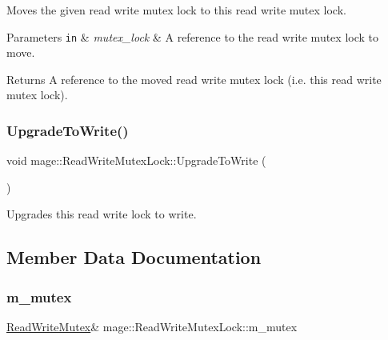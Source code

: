 Moves the given read write mutex lock to this read write mutex lock.


\begin{DoxyParams}[1]{Parameters}
\mbox{\tt in}  & {\em mutex\+\_\+lock} & A reference to the read write mutex lock to move. \\
\hline
\end{DoxyParams}
\begin{DoxyReturn}{Returns}
A reference to the moved read write mutex lock (i.\+e. this read write mutex lock). 
\end{DoxyReturn}
\hypertarget{structmage_1_1_read_write_mutex_lock_a01843784e8dbf0d3dfd6100562f699be}{}\label{structmage_1_1_read_write_mutex_lock_a01843784e8dbf0d3dfd6100562f699be} 
\subsubsection{\texorpdfstring{Upgrade\+To\+Write()}{UpgradeToWrite()}}
{\footnotesize\ttfamily void mage\+::\+Read\+Write\+Mutex\+Lock\+::\+Upgrade\+To\+Write (\begin{DoxyParamCaption}{ }\end{DoxyParamCaption})}

Upgrades this read write lock to write. 

\subsection{Member Data Documentation}
\hypertarget{structmage_1_1_read_write_mutex_lock_a6ee9034fa984e11ec07c20ec77ab1bfe}{}\label{structmage_1_1_read_write_mutex_lock_a6ee9034fa984e11ec07c20ec77ab1bfe} 
\subsubsection{\texorpdfstring{m\+\_\+mutex}{m\_mutex}}
{\footnotesize\ttfamily \hyperlink{structmage_1_1_read_write_mutex}{Read\+Write\+Mutex}\& mage\+::\+Read\+Write\+Mutex\+Lock\+::m\+\_\+mutex\hspace{0.3cm}{\ttfamily [private]}}

